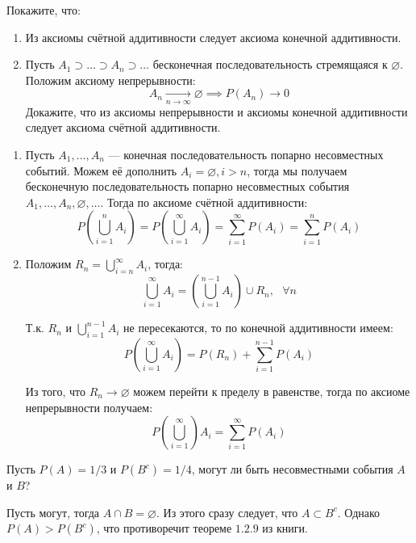 \documentclass[document]{subfiles}
\begin{document}
\begin{problem}
    Покажите, что:
    \begin{enumerate}
        \item Из аксиомы счётной аддитивности следует аксиома конечной аддитивности.
        \item Пусть $A_1 \supset \dots \supset A_n \supset \dots$ бесконечная последовательность стремящаяся к $\varnothing$. Положим аксиому непрерывности:
            \[A_n \underset{n \to \infty}{\longrightarrow} \varnothing \implies P(A_n) \to 0\]
            Докажите, что из аксиомы непрерывности и аксиомы конечной аддитивности следует аксиома счётной аддитивности.
    \end{enumerate}
\end{problem}
\begin{solution}
    \begin{enumerate}
        \item Пусть $A_1, \dots, A_n$ --- конечная последовательность попарно несовместных событий. Можем её дополнить ${A_i = \varnothing, i > n}$, тогда мы получаем бесконечную последовательность попарно несовместных события ${A_1, \dots, A_n, \varnothing, \dots}$. Тогда по аксиоме счётной аддитивности:
            \[P\left(\bigcup_{i=1}^n A_i\right) = P\left(\bigcup_{i=1}^\infty A_i\right) = \sum_{i=1}^\infty P(A_i) = \sum_{i=1}^n P(A_i)\]

        \item Положим $R_n = \bigcup_{i=n}^\infty A_i$, тогда:
            \[\bigcup_{i=1}^\infty A_i = \left( \bigcup_{i=1}^{n-1} A_i \right) \cup R_n, ~~~ \forall n\]

            Т.к. $R_n$ и $\bigcup_{i=1}^{n-1} A_i$ не пересекаются, то по конечной аддитивности имеем:
            \[P\left(\bigcup_{i=1}^\infty A_i\right) = P(R_n) + \sum_{i=1}^{n-1} P(A_i)\]

            Из того, что $R_n \to \varnothing$ можем перейти к пределу в равенстве, тогда по аксиоме непрерывности получаем:
            \[P\left(\bigcup_{i=1}^\infty\right) A_i = \sum_{i=1}^\infty P(A_i)\]
    \end{enumerate}
\end{solution}

\begin{problem}
    Пусть $P(A) = 1/3$ и $P(B^c) = 1/4$, могут ли быть несовместными события $A$ и $B$?
\end{problem}
\begin{solution}
    Пусть могут, тогда $A \cap B = \varnothing$. Из этого сразу следует, что $A \subset B^c$. Однако $P(A) > P(B^c)$, что противоречит теореме $1.2.9$ из книги.
\end{solution}
\end{document}
